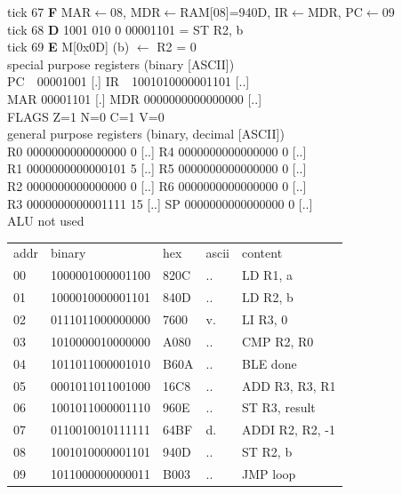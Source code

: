 \noindent\begin{tcolorbox}[stepbox, title={Instruction 23 \hfill ticks 67 to 69 \quad ST R2, b}]
\textcolor{dim}{tick 67} \textbf{F} MAR$\leftarrow$08, MDR$\leftarrow$RAM[08]=940D, IR$\leftarrow$MDR, PC$\leftarrow$09\\
\textcolor{dim}{tick 68} \textbf{D} 1001 010 0 00001101 = ST R2, b\\
\textcolor{dim}{tick 69} \textbf{E} M[0x0D] (b) $\leftarrow$ R2 = 0\\[2pt]
\textcolor{dim}{special purpose registers (binary [ASCII])}\\
PC~~00001001 [.] \hfill IR~~1001010000001101 [..]\\
MAR 00001101 [.] \hfill MDR 0000000000000000 [..]\\
FLAGS Z=1 N=0 C=1 V=0\\[2pt]
\textcolor{dim}{general purpose registers (binary, decimal [ASCII])}\\
R0 0000000000000000 0 [..] \hfill R4 0000000000000000 0 [..]\\
R1 0000000000000101 5 [..] \hfill R5 0000000000000000 0 [..]\\
R2 0000000000000000 0 [..] \hfill R6 0000000000000000 0 [..]\\
R3 0000000000001111 15 [..] \hfill SP 0000000000000000 0 [..]\\
\textcolor{dim}{ALU not used}\\[2pt]
{\setlength{\tabcolsep}{2pt}\begin{tabular}{@{}lllll@{}}
\textcolor{dim}{addr} & \textcolor{dim}{binary} & \textcolor{dim}{hex} & \textcolor{dim}{ascii} & \textcolor{dim}{content}\\
00 & 1000001000001100 & 820C & .. & LD R1, a\\
01 & 1000010000001101 & 840D & .. & LD R2, b\\
02 & 0111011000000000 & 7600 & v. & LI R3, 0\\
03 & 1010000010000000 & A080 & .. & CMP R2, R0\\
04 & 1011011000001010 & B60A & .. & BLE done\\
05 & 0001011011001000 & 16C8 & .. & ADD R3, R3, R1\\
06 & 1001011000001110 & 960E & .. & ST R3, result\\
07 & 0110010010111111 & 64BF & d. & ADDI R2, R2, -1\\
08 & 1001010000001101 & 940D & .. & ST R2, b\\
\rowcolor{pcc}09 & 1011000000000011 & B003 & .. & JMP loop\\

\end{tabular}}
\end{tcolorbox}

